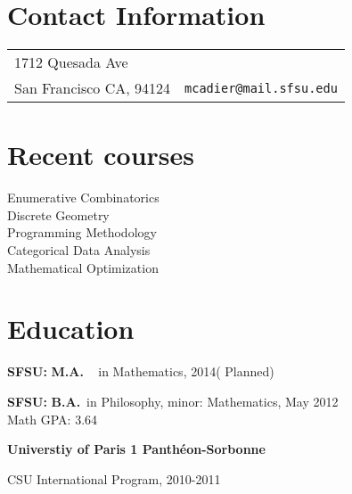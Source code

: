 \documentclass[margin,line,pifont,palatino,courier]{res}
\newenvironment{list1}{
  \begin{list}{\ding{113}}{%
      \setlength{\itemsep}{0in}
      \setlength{\parsep}{0in} \setlength{\parskip}{0in}
      \setlength{\topsep}{0in} \setlength{\partopsep}{0in}
      \setlength{\leftmargin}{0.17in}}}{\end{list}}
\begin{document}

\begin{resume}

\section{\sc Contact Information}

\vspace{.05in}
\begin{tabular}{@{}p{2.75in}p{2in}}
1712 Quesada Ave      &  \\
     San Francisco CA, 94124                     & \verb+mcadier@mail.sfsu.edu+\\

\end{tabular}

\section{\sc Recent courses}
Enumerative Combinatorics\\
 Discrete Geometry\\
 Programming Methodology\\
 Categorical Data Analysis\\
 Mathematical Optimization\\

 
 \section{\sc Education}



 
\begin{list1}
\item  {\bf SFSU:}  \textbf{M.A.} ~ in Mathematics, 2014( Planned) \\


\item  {\bf SFSU:}  \textbf{B.A.}~in Philosophy, minor:    
Mathematics, May 2012 \\
Math GPA: 3.64  \\




\item {\bf Universtiy of Paris 1 Panth\'{e}on-Sorbonne}

CSU International Program,  2010-2011\\


\end{list1}
\end{resume}
\end{document}
